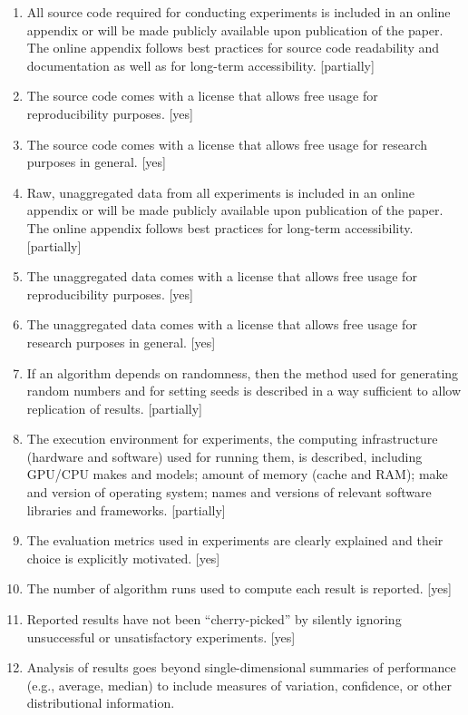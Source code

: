 \begin{enumerate}
    \item
    All source code required for conducting experiments is included in an online appendix
    or will be made publicly available upon publication of the paper.
    The online appendix follows best practices for source code readability and documentation as well as for long-term accessibility.
    [partially]
    \item The source code comes with a license that
    allows free usage for reproducibility purposes.
    [yes]
    \item The source code comes with a license that
    allows free usage for research purposes in general.
    [yes]
    \item
    Raw, unaggregated data from all experiments is included in an online appendix
    or will be made publicly available upon publication of the paper.
    The online appendix follows best practices for long-term accessibility.
    [partially]
    \item The unaggregated data comes with a license that
    allows free usage for reproducibility purposes.
    [yes]
    \item The unaggregated data comes with a license that
    allows free usage for research purposes in general.
    [yes]
    \item If an algorithm depends on randomness, then the method used for generating random numbers and for setting seeds is described in a way sufficient to allow replication of results.
    [partially]
    \item The execution environment for experiments, the computing infrastructure (hardware and software) used for running them, is described, including GPU/CPU makes and models; amount of memory (cache and RAM); make and version of operating system; names and versions of relevant software libraries and frameworks.
    [partially]
    \item
    The evaluation metrics used in experiments are clearly explained and their choice is explicitly motivated.
    [yes]
    \item
    The number of algorithm runs used to compute each result is reported.
    [yes]
    \item
    Reported results have not been ``cherry-picked'' by silently ignoring unsuccessful or unsatisfactory experiments.
    [yes]
    \item
    Analysis of results goes beyond single-dimensional summaries of performance (e.g., average, median) to include measures of variation, confidence, or other distributional information.

\end{enumerate}

